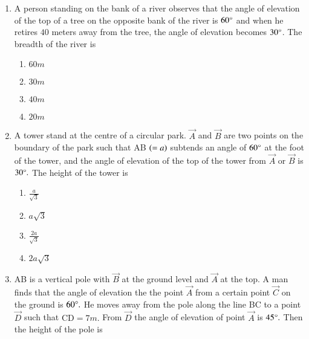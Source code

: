 \begin{enumerate}[label=\thesubsection.\arabic*,ref=\thesubsection.\theenumi]
\item A person standing on the bank of a river observes that the angle of elevation of the top of a tree on the opposite bank of the river is $60\degree$ and when he retires $40$ meters away from the tree, the angle of elevation becomes $30\degree$. The breadth of the river is 

\hfill{}
\begin{multicols}{4}
\begin{enumerate}
        \item $60m$                    
        \item $30m$ 
        \item $40m$ 
        \item $20m$
\end{enumerate}
\end{multicols} 

\item A tower stand at the centre of a circular park. $\vec{A}$ and $\vec{B}$ are two points on the boundary of the park such that AB $\left(=a\right)$ subtends an angle of $60\degree$ at the foot of the tower, and the angle of elevation of the top of the tower from $\vec{A}$ or $\vec{B}$ is $30\degree.$ The height of the tower is \hfill{}
\begin{multicols}{4}
\begin{enumerate}
        \item $\frac{a}{\sqrt{3}}$                    
        \item $a\sqrt{3}$ 
        \item $\frac{2a}{\sqrt{3}}$ 
        \item $2a\sqrt{3}$
\end{enumerate}
\end{multicols} 

\item AB is a vertical pole with $\vec{B}$ at the ground level and $\vec{A}$ at the top. A man finds that the angle of elevation the the point $\vec{A}$ from a certain point $\vec{C}$ on the ground is $60\degree.$ He moves away from the pole along the line BC to a point $\vec{D}$ such that $\text{CD}=7m.$ From $\vec{D}$ the angle of elevation of point $\vec{A}$ is $45\degree.$ Then the height of the pole is  


\end{enumerate}
